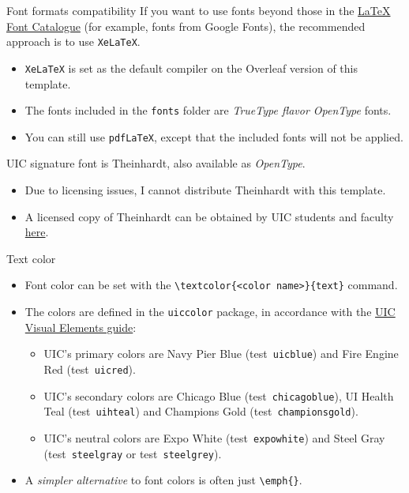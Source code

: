 \documentclass{beamer}
\newcommand{\hrefcol}[2]{\textcolor{uihteal}{\href{#1}{#2}}}
\newcommand{\testcolor}[1]{\colorbox{#1}{\textcolor{#1}{test}}~\texttt{#1}}
\begin{document}
\begin{frame}[fragile]{Font formats compatibility}
If you want to use fonts beyond those in the \hrefcol{https://tug.org/FontCatalogue/}{LaTeX Font Catalogue} (for example, fonts from Google Fonts), the recommended approach is to use \verb|XeLaTeX|.
\begin{itemize}
\item \verb|XeLaTeX| is set as the default compiler on the Overleaf version of this template.
\item The fonts included in the \verb|fonts| folder are \emph{TrueType flavor OpenType} fonts.
\item You can still use \verb|pdfLaTeX|, except that the included fonts will not be applied.
\end{itemize}
UIC signature font is Theinhardt, also available as \emph{OpenType}.
\begin{itemize}
\item Due to licensing issues, I cannot distribute Theinhardt with this template.
\item A licensed copy of Theinhardt can be obtained by UIC students and faculty \hrefcol{https://marketing.uic.edu/marketing-toolbox/uic-fonts/}{here}.
\end{itemize}
\end{frame}


\begin{frame}[fragile]{Text color}
\begin{itemize}
\item Font color can be set with the \verb|\textcolor{<color name>}{text}| command.
\item The colors are defined in the \texttt{uiccolor} package, in accordance with the \hrefcol{https://marketing.uic.edu/marketing-toolbox/university-style-guide/visual-elements/}{UIC Visual Elements guide}:
  \begin{itemize}
  \item UIC's primary colors are Navy Pier Blue (\testcolor{uicblue}) and Fire Engine Red (\testcolor{uicred}).
  \item UIC's secondary colors are Chicago Blue (\testcolor{chicagoblue}), UI Health Teal (\testcolor{uihteal}) and Champions Gold (\testcolor{championsgold}).
  \item UIC's neutral colors are Expo White (\testcolor{expowhite}) and Steel Gray (\testcolor{steelgray} or \testcolor{steelgrey}).
  \end{itemize}
\item A \emph{simpler alternative} to font colors is often just \verb|\emph{}|.
\end{itemize}
\end{frame}
\end{document}
